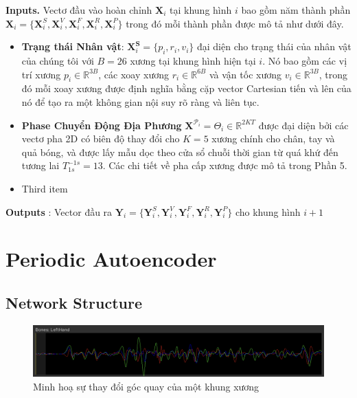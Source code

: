 \textbf{Inputs.} Vectơ đầu vào hoàn chỉnh $\textbf{X}_i$ tại khung hình $i$ bao gồm năm thành phần $\textbf{X}_i = \{ \textbf{X}^S_i, \textbf{X}^V_i, \textbf{X}^F_i, \textbf{X}^R_i, \textbf{X}^P_i \}$ trong đó mỗi thành phần được mô tả như dưới đây.

\begin{itemize}
	\item \textbf{Trạng thái Nhân vật}: \(\textbf{X}^\textbf{S}_i = \{p_i, r_i, v_i\}\) đại diện cho trạng thái của nhân vật của chúng tôi với \(B = 26\) xương tại khung hình hiện tại \(i\). Nó bao gồm các vị trí xương \(p_i \in \mathbb{R}^{3B}\), các xoay xương \(r_i \in \mathbb{R}^{6B}\) và vận tốc xương \(v_i \in \mathbb{R}^{3B}\), trong đó mỗi xoay xương được định nghĩa bằng cặp vector Cartesian tiến và lên của nó để tạo ra một không gian nội suy rõ ràng và liên tục.
	\item \textbf{Phase Chuyển Động Địa Phương} $\textbf{X}^{\mathcal{P}_i} = \Theta_i \in \mathbb{R}^{2KT}$ được đại diện bởi các vectơ pha 2D có biên độ thay đổi cho \(K = 5\) xương chính cho chân, tay và quả bóng, và được lấy mẫu dọc theo cửa sổ chuỗi thời gian từ quá khứ đến tương lai $T_{1s}^{-1s} = 13$. Các chi tiết về pha cấp xương được mô tả trong Phần 5.
	\item Third item
\end{itemize}

\textbf{Outputs} : Vector đầu ra $\textbf{Y}_i = \{ \textbf{Y}^S_i, \textbf{Y}^V_i, \textbf{Y}^F_i, \textbf{Y}^R_i, \textbf{Y}^P_i \}$ cho khung hình $i+1$

\section{Periodic Autoencoder}
\label{PeriodicAutoencoder}
	
\subsection{Network Structure}

\begin{figure}
    \centering
    \includegraphics[width=\linewidth]{images/BoneRotationSeries.png}
    \caption{Minh hoạ sự thay đổi góc quay của một khung xương}
    \label{fig:BoneRotationSeries}
\end{figure}

